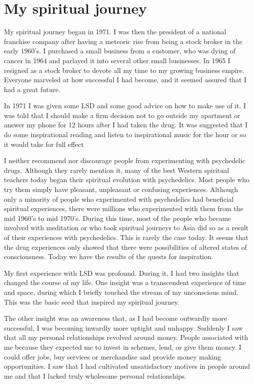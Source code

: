 \documentclass[a5paper,10pt,english]{book}
\begin{document}
\section{My spiritual journey}
\label{\detokenize{preface:my-spiritual-journey}}
\sphinxAtStartPar
My spiritual journey began in 1971. I was then the president of a
national franchise company after having a meteoric rise from being a
stock broker in the early 1960’s. I purchased a small business from a
customer, who was dying of cancer in 1964 and parlayed it into several
other small businesses. In 1965 I resigned as a stock broker to devote
all my time to my growing business empire. Everyone marveled at how
successful I had become, and it seemed assured that I had a great
future.

\sphinxAtStartPar
In 1971 I was given some LSD and some good advice on how to make use of
it. I was told that I should make a firm decision not to go outside my
apartment or answer my phone for 12 hours after I had taken the drug. It
was suggested that I do some inspirational reading and listen to
inspirational music for the hour or so it would take for full effect

\sphinxAtStartPar
I neither recommend nor discourage people from experimenting with
psychedelic drugs. Although they rarely mention it, many of the best
Western spiritual teachers today began their spiritual evolution with
psychedelics. Most people who try them simply have pleasant, unpleasant
or confusing experiences. Although only a minority of people who
experimented with psychedelics had beneficial spiritual experiences,
there were millions who experimented with them from the mid 1960’s to
mid 1970’s. During this time, most of the people who became involved
with meditation or who took spiritual journeys to Asia did so as a
result of their experiences with psychedelics. This is rarely the case
today. It seems that the drug experiences only showed that there were
possibilities of altered states of consciousness. Today we have the
results of the quests for inspiration.

\sphinxAtStartPar
My first experience with LSD was profound. During it, I had two insights
that changed the course of my life. One insight was a transcendent
experience of time and space, during which I briefly touched the stream
of my unconscious mind. This was the basic seed that inspired my
spiritual journey.

\sphinxAtStartPar
The other insight was an awareness that, as I had become outwardly more
successful, I was becoming inwardly more uptight and unhappy. Suddenly I
saw that all my personal relationships revolved around money. People
associated with me because they expected me to invest in schemes, lend,
or give them money. I could offer jobs, buy services or merchandise and
provide money making opportunities. I saw that I had cultivated
unsatisfactory motives in people around me and that I lacked truly
wholesome personal relationships.
\end{document}
